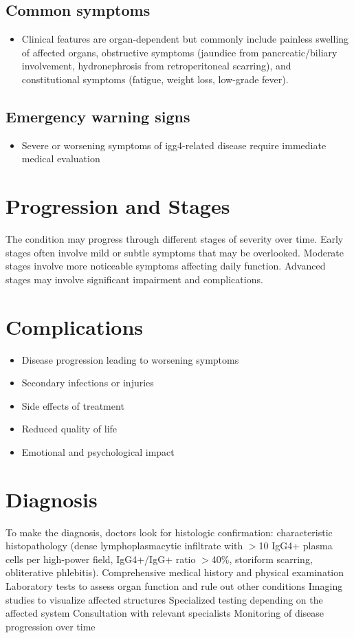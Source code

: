 \subsection{Common symptoms}
\begin{itemize}[noitemsep]
  \item Clinical features are organ-dependent but commonly include painless swelling of affected organs, obstructive symptoms (jaundice from pancreatic/biliary involvement, hydronephrosis from retroperitoneal scarring), and constitutional symptoms (fatigue, weight loss, low-grade fever). 
  \end{itemize}

\subsection{Emergency warning signs}
\begin{itemize}[noitemsep]
  \item Severe or worsening symptoms of igg4-related disease require immediate medical evaluation
\end{itemize}
\section{Progression and Stages}
The condition may progress through different stages of severity over time. Early stages often involve mild or subtle symptoms that may be overlooked. Moderate stages involve more noticeable symptoms affecting daily function. Advanced stages may involve significant impairment and complications.
\section{Complications}
\begin{itemize}[noitemsep]
  \item Disease progression leading to worsening symptoms
  \item Secondary infections or injuries
  \item Side effects of treatment
  \item Reduced quality of life
  \item Emotional and psychological impact
\end{itemize}
\section{Diagnosis}
To make the diagnosis, doctors look for histologic confirmation: characteristic histopathology (dense lymphoplasmacytic infiltrate with $>$10 IgG4+ plasma cells per high-power field, IgG4+/IgG+ ratio $>$40\%, storiform scarring, obliterative phlebitis). Comprehensive medical history and physical examination Laboratory tests to assess organ function and rule out other conditions Imaging studies to visualize affected structures Specialized testing depending on the affected system Consultation with relevant specialists Monitoring of disease progression over time


